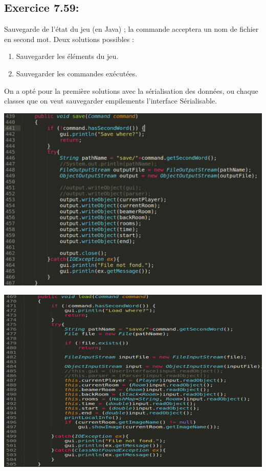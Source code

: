 \documentclass[french,10pt,a4paper]{report}
\begin{document}
\subsection{\textcolor{bb}{Exercice 7.59:}}
Sauvegarde de l’état du jeu (en Java) ; la commande acceptera un nom de fichier en second mot. Deux solutions possibles :
\begin{enumerate}
\item Sauvegarder les éléments du jeu.
\item Sauvegarder les commandes exécutées.	
\end{enumerate}
On a opté pour la première solutions avec la sérialisation des données, ou chaque classes que on veut sauvegarder empilements  l’interface Sérialisable.    
\begin{center}
	\includegraphics[scale=0.4]{captures/it4_10.png}
\end{center}
\begin{center}
	\includegraphics[scale=0.51]{captures/it4_11.png}
\end{center}
\end{document}
